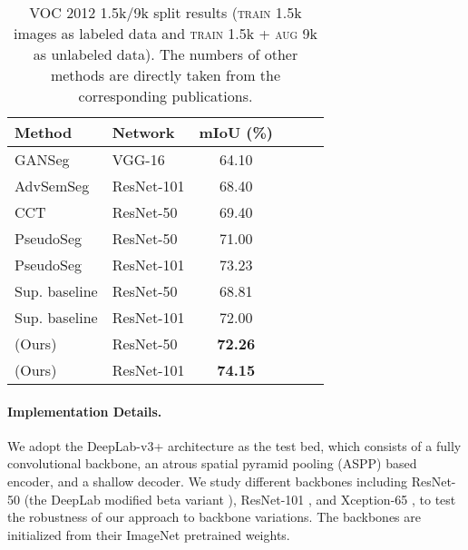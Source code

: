 \begin{table}[tb]
    \small
    \centering
    \caption{VOC 2012 1.5k/9k split results (\textsc{train} 1.5k images as labeled data and \textsc{train} 1.5k + \textsc{aug} 9k as unlabeled data). The numbers of other methods are directly taken from the corresponding publications.}
    \label{tab:voc2}
    \setlength{\tabcolsep}{10pt}
    \begin{tabular}{llcccc}
    \toprule
        Method    & Network & mIoU (\%)  \\
    \midrule
        GANSeg \cite{souly2017semi} & VGG-16 & 64.10  \\
        AdvSemSeg \cite{hung2019adversarial} & ResNet-101  & 68.40  \\
        CCT \cite{ouali2020semi} & ResNet-50  & 69.40 \\
        PseudoSeg \cite{zou2020pseudoseg} & ResNet-50  & 71.00 \\
        PseudoSeg \cite{zou2020pseudoseg} & ResNet-101 & 73.23 \\
    \midrule
        Sup. baseline  & ResNet-50  & 68.81 \\
        Sup. baseline  & ResNet-101 & 72.00 \\
        \ours{} (Ours) & ResNet-50  & \textbf{72.26}  \\
        \ours{} (Ours) & ResNet-101 & \textbf{74.15}  \\
    \bottomrule
    \end{tabular}
    \vspace{-5pt}
\end{table}


\paragraph{Implementation Details.}
We adopt the DeepLab-v3+ architecture \cite{chen2018encoder} as the test bed, which consists of a fully convolutional backbone, an atrous spatial pyramid pooling (ASPP) based encoder, and a shallow decoder.
We study different backbones including ResNet-50 (the DeepLab modified beta variant \cite{chen2018encoder}), ResNet-101 \cite{he2016deep}, and Xception-65 \cite{chollet2017xception}, to test the robustness of our approach to backbone variations.
The backbones are initialized from their ImageNet \cite{deng2009imagenet} pretrained weights.

